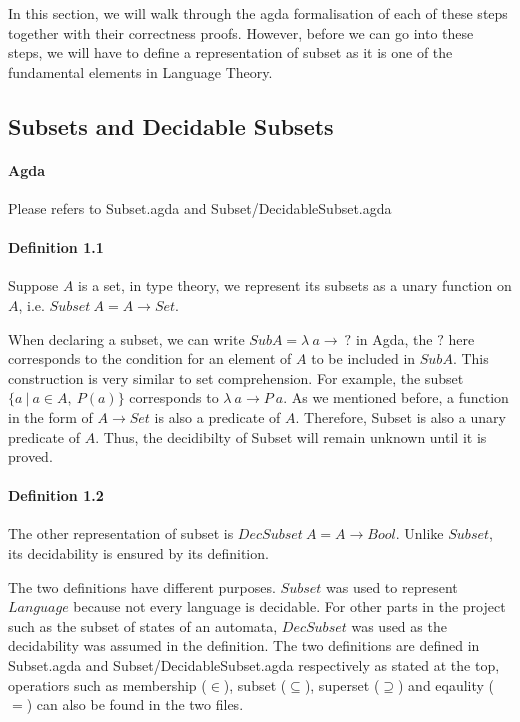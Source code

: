 \documentclass[twoside,openright,final]{bhamthesis}
\begin{document}
\par In this section, we will walk through the agda formalisation of
each of these steps together with their correctness proofs. However,
before we can go into these steps, we will have to define a
representation of subset as it is one of the fundamental elements in
Language Theory.

\subsection{Subsets and Decidable Subsets}
\paragraph{Agda} Please refers to Subset.agda and Subset/DecidableSubset.agda

\paragraph{Definition 1.1} Suppose \(A\) is a set, in type theory, we represent its subsets as a unary function on
\(A\), i.e. \(Subset\ A = A \to Set\). \\

\par When declaring a subset, we can write \(SubA =
\lambda\ a \to\ ?\) in Agda, the \(?\) here corresponds to the
condition for an element of \(A\) to be included in \(SubA\). This construction is
very similar to set comprehension. For example, the subset 
\(\{a\ | \ a \in A,\ P(a)\}\) corresponds to \(\lambda\ a \to P\
a\). As we mentioned before, a function in the form of \(A \to
Set\) is also a predicate of \(A\). Therefore, Subset is also a unary
predicate of \(A\). Thus, the decidibilty of Subset will remain
unknown until it is proved. 

\paragraph{Definition 1.2} The other representation of subset is \(DecSubset\ A = A \to
Bool\). Unlike \(Subset\), its decidability is ensured by its
definition. \\

\par The two definitions have different purposes. \(Subset\) was used to represent \(Language\) because not every
language is decidable. For other parts in the project 
such as the subset of states of an automata, \(DecSubset\) was used
as the decidability was assumed in the definition. The two definitions
are defined in Subset.agda and Subset/DecidableSubset.agda
respectively as stated at the top, operatiors such as membership (\(\in\)), subset
(\(\subseteq\)), superset (\(\supseteq\)) and eqaulity (\(=\)) can
also be found in the two files. 
\end{document}
